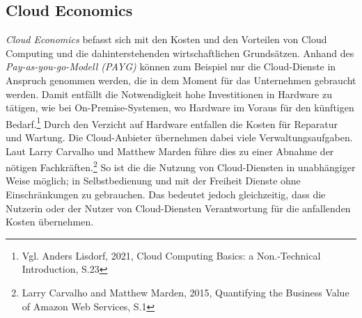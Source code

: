 \subsection{Cloud Economics}\label{subsec_UabsGrund3}
\textit{Cloud Economics} befasst sich mit den Kosten und den Vorteilen von Cloud Computing und die dahinterstehenden wirtschaftlichen Grundsätzen. Anhand des \textit{Pay-as-you-go-Modell (PAYG)} können zum Beispiel nur die Cloud-Dienste in Anspruch genommen werden, die in dem Moment für das Unternehmen gebraucht werden. Damit entfällt die Notwendigkeit hohe Investitionen in Hardware zu tätigen, wie bei On-Premise-Systemen, wo Hardware im Voraus für den künftigen Bedarf.\footnote{Vgl. Anders Lisdorf, 2021, Cloud Computing Basics: a Non.-Technical Introduction, S.23\cite{CCB}} Durch den Verzicht auf Hardware entfallen die Kosten für Reparatur und Wartung. Die Cloud-Anbieter übernehmen dabei viele Verwaltungsaufgaben. Laut Larry Carvalho und Matthew Marden führe dies zu einer Abnahme der nötigen Fachkräften.\footnote{Larry Carvalho and Matthew Marden, 2015, Quantifying the Business Value of Amazon Web Services, S.1\cite{IDC01}} So ist die die Nutzung von Cloud-Diensten in unabhängiger Weise möglich; in Selbstbedienung und mit der Freiheit Dienste ohne Einschränkungen zu gebrauchen. Das bedeutet jedoch gleichzeitig, dass die Nutzerin oder der Nutzer von Cloud-Diensten Verantwortung für die anfallenden Kosten übernehmen.


